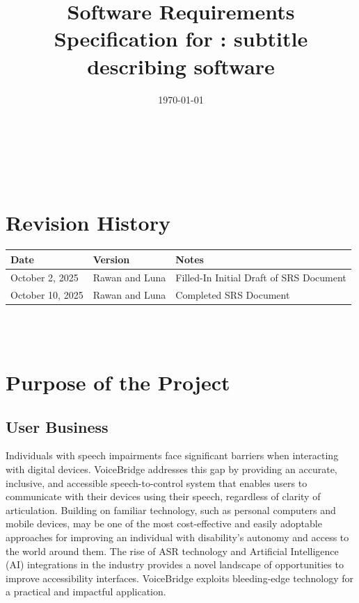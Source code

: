\documentclass[12pt]{article}
\begin{document}
\title{Software Requirements Specification for \progname: subtitle describing software} 
\author{\authname}
\date{\today}
	
\maketitle

~\newpage


\tableofcontents

~\newpage

\section*{Revision History}

\begin{tabularx}{\textwidth}{p{3cm}p{2cm}X}
\toprule {\textbf{Date}} & {\textbf{Version}} & {\textbf{Notes}}\\
\midrule
October 2, 2025 & Rawan and Luna & Filled-In Initial Draft of SRS Document\\
October 10, 2025 & Rawan and Luna & Completed SRS Document\\

\bottomrule
\end{tabularx}

~\\

~\newpage
\section{Purpose of the Project}
\subsection{User Business}


Individuals with speech impairments face significant barriers when interacting with digital devices. VoiceBridge addresses this gap by providing an accurate, inclusive, and accessible speech-to-control system that enables users to communicate with their devices using their speech, regardless of clarity of articulation. Building on familiar technology, such as personal computers and mobile devices, may be one of the most cost-effective and easily adoptable approaches for improving an individual with disability’s autonomy and access to the world around them. The rise of ASR technology and Artificial Intelligence (AI) integrations in the industry provides a novel landscape of opportunities to improve accessibility interfaces. VoiceBridge exploits bleeding-edge technology for a practical and impactful application.
\end{document}
